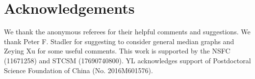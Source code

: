 \documentclass{article}
\begin{document}
\section*{Acknowledgements}

We thank the anonymous referees for their helpful comments and suggestions.
We thank Peter F. Stadler for suggesting to consider general median graphs
and Zeying Xu for some useful comments.
This work is supported by the NSFC (11671258) and STCSM (17690740800).
YL acknowledges support of Postdoctoral Science Foundation of China (No. 2016M601576).





\end{document}
